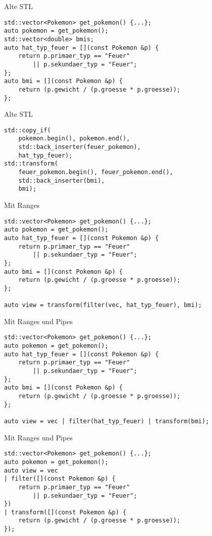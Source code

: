 \begin{frame}[fragile]{Alte STL}
    \begin{verbatim}
std::vector<Pokemon> get_pokemon() {...};
auto pokemon = get_pokemon();
std::vector<double> bmis;
auto hat_typ_feuer = [](const Pokemon &p) {
    return p.primaer_typ == "Feuer"
        || p.sekundaer_typ = "Feuer";
};
auto bmi = [](const Pokemon &p) {
    return (p.gewicht / (p.groesse * p.groesse));
};

    \end{verbatim}
\end{frame}

\begin{frame}[fragile]{Alte STL}
    \begin{verbatim}
std::copy_if(
    pokemon.begin(), pokemon.end(),
    std::back_inserter(feuer_pokemon),
    hat_typ_feuer);
std::transform(
    feuer_pokemon.begin(), feuer_pokemon.end(),
    std::back_inserter(bmi),
    bmi);
    \end{verbatim}
\end{frame}

\begin{frame}[fragile]{Mit Ranges}
    \begin{verbatim}
std::vector<Pokemon> get_pokemon() {...};
auto pokemon = get_pokemon();
auto hat_typ_feuer = [](const Pokemon &p) {
    return p.primaer_typ == "Feuer"
        || p.sekundaer_typ = "Feuer";
};
auto bmi = [](const Pokemon &p) {
    return (p.gewicht / (p.groesse * p.groesse));
};

auto view = transform(filter(vec, hat_typ_feuer), bmi);

\end{verbatim}
\end{frame}

\begin{frame}[fragile]{Mit Ranges und Pipes}
    \begin{verbatim}
std::vector<Pokemon> get_pokemon() {...};
auto pokemon = get_pokemon();
auto hat_typ_feuer = [](const Pokemon &p) {
    return p.primaer_typ == "Feuer"
        || p.sekundaer_typ = "Feuer";
};
auto bmi = [](const Pokemon &p) {
    return (p.gewicht / (p.groesse * p.groesse));
};

auto view = vec | filter(hat_typ_feuer) | transform(bmi);

    \end{verbatim}
\end{frame}

\begin{frame}[fragile]{Mit Ranges und Pipes}
    \begin{verbatim}
std::vector<Pokemon> get_pokemon() {...};
auto pokemon = get_pokemon();
auto view = vec
| filter([](const Pokemon &p) {
    return p.primaer_typ == "Feuer"
        || p.sekundaer_typ = "Feuer";
})
| transform([](const Pokemon &p) {
    return (p.gewicht / (p.groesse * p.groesse));
});
    \end{verbatim}
\end{frame}

